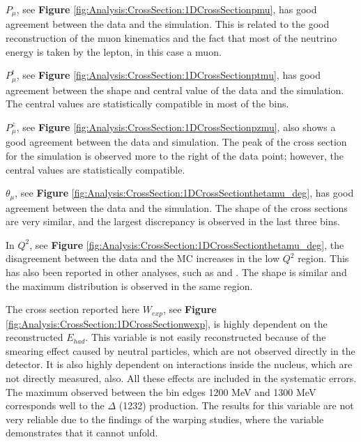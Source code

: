 $P_\mu$, see \textbf{Figure} \ref{fig:Analysis:CrossSection:1DCrossSectionpmu}, has good agreement between the data and the simulation. This is related to the good reconstruction of the muon kinematics and the fact that most of the neutrino energy is taken by the lepton, in this case a muon.

$P^t_\mu$, see \textbf{Figure} \ref{fig:Analysis:CrossSection:1DCrossSectionptmu}, has good agreement between the shape and central value of the data and the simulation. The central values are statistically compatible in most of the bins. 

$P^z_\mu$, see \textbf{Figure} \ref{fig:Analysis:CrossSection:1DCrossSectionpzmu}, also shows a good agreement between the data and simulation. The peak of the cross section for the simulation is observed more to the right of the data point; however, the central values are statistically compatible. 

$\theta_\mu$, see \textbf{Figure} \ref{fig:Analysis:CrossSection:1DCrossSectionthetamu_deg}, has good agreement between the data and the simulation. The shape of the cross sections are very similar, and the largest discrepancy is observed in the last three bins. 

In $Q^2$, see \textbf{Figure} \ref{fig:Analysis:CrossSection:1DCrossSectionthetamu_deg}, the disagreement between the data and the MC increases in the low $Q^2$ region. This has also been reported in other analyses, such as \cite{Bercellie.131.011801} and \cite{Eberly:2014mra}. The shape is similar and the maximum distribution is observed in the same region.

The cross section reported here $W_{exp}$, see \textbf{Figure} \ref{fig:Analysis:CrossSection:1DCrossSectionwexp}, is highly dependent on the reconstructed $E_{had}$. This variable is not easily reconstructed because of the smearing effect caused by neutral particles, which are not observed directly in the detector. It is also highly dependent on interactions inside the nucleus, which are not directly measured, also. All these effects are included in the systematic errors. The maximum observed between the bin edges 1200 MeV and 1300 MeV corresponds well to the $\Delta$ (1232) production. The results for this variable are not very reliable due to the findings of the warping studies, where the variable demonstrates that it cannot unfold.


